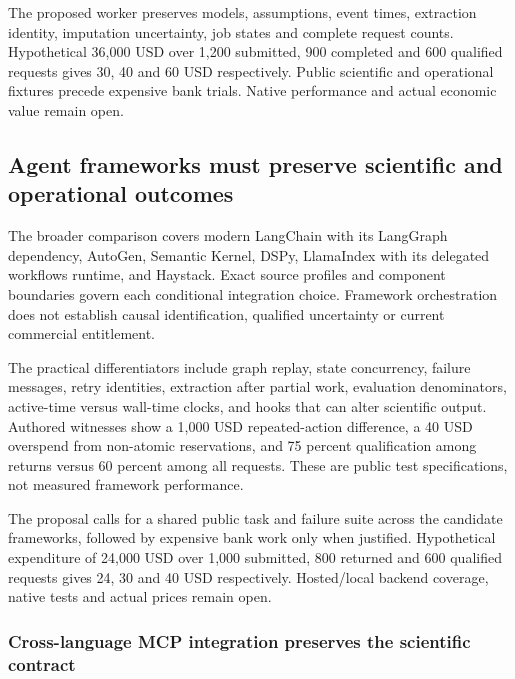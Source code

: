The proposed worker preserves models, assumptions, event times,
extraction identity, imputation uncertainty, job states and complete
request counts. Hypothetical 36,000 USD over 1,200 submitted, 900
completed and 600 qualified requests gives 30, 40 and 60 USD
respectively. Public scientific and operational fixtures precede
expensive bank trials. Native performance and actual economic value
remain open. \citep{exec24_sas_choice}

\hypertarget{agent-frameworks-must-preserve-scientific-and-operational-outcomes}{%
\subsection{Agent frameworks must preserve scientific and operational
outcomes}\label{agent-frameworks-must-preserve-scientific-and-operational-outcomes}}

The broader comparison covers modern LangChain with its LangGraph
dependency, AutoGen, Semantic Kernel, DSPy, LlamaIndex with its
delegated workflows runtime, and Haystack. Exact source profiles and
component boundaries govern each conditional integration choice.
Framework orchestration does not establish causal identification,
qualified uncertainty or current commercial entitlement.
\citep{exec24_framework_contracts}

The practical differentiators include graph replay, state concurrency,
failure messages, retry identities, extraction after partial work,
evaluation denominators, active-time versus wall-time clocks, and hooks
that can alter scientific output. Authored witnesses show a 1,000 USD
repeated-action difference, a 40 USD overspend from non-atomic
reservations, and 75 percent qualification among returns versus 60
percent among all requests. These are public test specifications, not
measured framework performance. \citep{exec24_framework_contracts}

The proposal calls for a shared public task and failure suite across the
candidate frameworks, followed by expensive bank work only when
justified. Hypothetical expenditure of 24,000 USD over 1,000 submitted,
800 returned and 600 qualified requests gives 24, 30 and 40 USD
respectively. Hosted/local backend coverage, native tests and actual
prices remain open. \citep{exec24_framework_contracts}

\hypertarget{cross-language-mcp-integration-preserves-the-scientific-contract}{%
\subsubsection{Cross-language MCP integration preserves the scientific
contract}\label{cross-language-mcp-integration-preserves-the-scientific-contract}}

